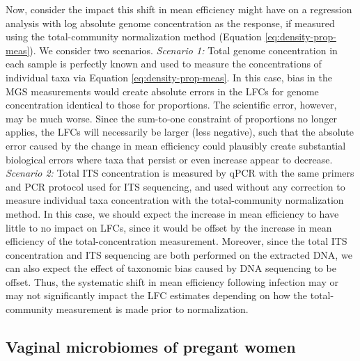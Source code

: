 \documentclass[
]{article}
\begin{document}
Now, consider the impact this shift in mean efficiency might have on a regression analysis with log absolute genome concentration as the response, if measured using the total-community normalization method (Equation \eqref{eq:density-prop-meas}).
We consider two scenarios.
\emph{Scenario 1:} Total genome concentration in each sample is perfectly known and used to measure the concentrations of individual taxa via Equation \eqref{eq:density-prop-meas}.
In this case, bias in the MGS measurements would create absolute errors in the LFCs for genome concentration identical to those for proportions.
The scientific error, however, may be much worse.
Since the sum-to-one constraint of proportions no longer applies, the LFCs will necessarily be larger (less negative), such that the absolute error caused by the change in mean efficiency could plausibly create substantial biological errors where taxa that persist or even increase appear to decrease.
\emph{Scenario 2:} Total ITS concentration is measured by qPCR with the same primers and PCR protocol used for ITS sequencing, and used without any correction to measure individual taxa concentration with the total-community normalization method.
In this case, we should expect the increase in mean efficiency to have little to no impact on LFCs, since it would be offset by the increase in mean efficiency of the total-concentration measurement.
Moreover, since the total ITS concentration and ITS sequencing are both performed on the extracted DNA, we can also expect the effect of taxonomic bias caused by DNA sequencing to be offset.
Thus, the systematic shift in mean efficiency following infection may or may not significantly impact the LFC estimates depending on how the total-community measurement is made prior to normalization.

\hypertarget{vaginal-microbiomes-of-pregant-women}{%
\subsection{Vaginal microbiomes of pregant women}\label{vaginal-microbiomes-of-pregant-women}}
\end{document}
